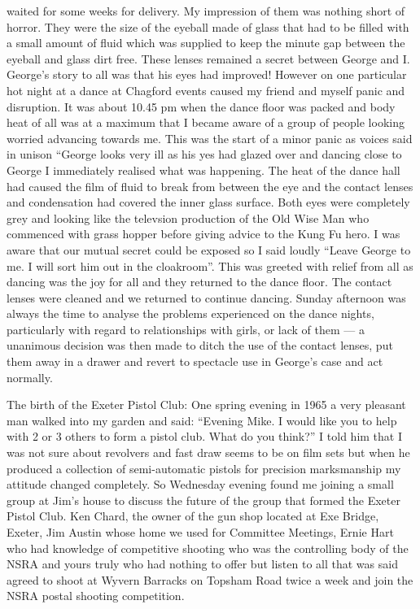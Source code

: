 waited for some weeks for delivery.  My impression of them was nothing short of
horror.  They were the size of the eyeball made of glass that had to be filled
with a small amount of fluid which was supplied to keep the minute gap between
the eyeball and glass dirt free. These lenses remained a secret between George
and I.  George's story to all was that his eyes had improved! However on one
particular hot night at a dance at Chagford events caused my friend and myself
panic and disruption.  It was about 10.45 pm when the dance floor was packed
and body heat of all was at a maximum that I became aware of a group of people
looking worried advancing towards me.  This was the start of a minor panic as
voices said in unison ``George looks very ill as his yes had glazed over and
dancing close to George I immediately realised what was happening.  The heat of
the dance hall had caused the film of fluid to break from between the eye and
the contact lenses and condensation had covered the inner glass surface.  Both
eyes were completely grey and looking like the televsion production of the Old
Wise Man who commenced with                 grass hopper before giving advice
to the Kung Fu hero.  I was aware that our mutual secret could be exposed so I
said loudly ``Leave George to me.  I will sort him out in the cloakroom''. This
was greeted with relief from all as dancing was the joy for all and they
returned to the dance floor. The contact lenses were cleaned and we returned to
continue dancing. Sunday afternoon was always the time to analyse the problems
experienced on the dance nights, particularly with regard to relationships with
girls, or lack of them --- a unanimous decision was then made to ditch the use
of the contact lenses, put them away in a drawer and revert to spectacle use in
George's case and act normally.

The birth of the Exeter Pistol Club:  One spring evening in 1965 a very pleasant
man walked into my garden and said: ``Evening Mike.  I would like you to help
with 2 or 3 others to form a pistol club.  What do you think?''  I told him
that I was not sure about revolvers and fast draw seems to be on film sets but
when he produced a collection of semi-automatic pistols for precision
marksmanship  my attitude changed completely.  So Wednesday evening found me
joining a small group at Jim's house to discuss the future of the group that
formed the Exeter Pistol Club. Ken Chard, the owner of the gun shop located at
Exe Bridge, Exeter, Jim Austin whose home we used for Committee Meetings, Ernie
Hart who had knowledge of competitive shooting who was the controlling body of
the NSRA and yours truly who had nothing to offer but listen to all that was
said agreed to shoot at Wyvern Barracks on Topsham Road twice a week and join
the NSRA postal shooting competition.

